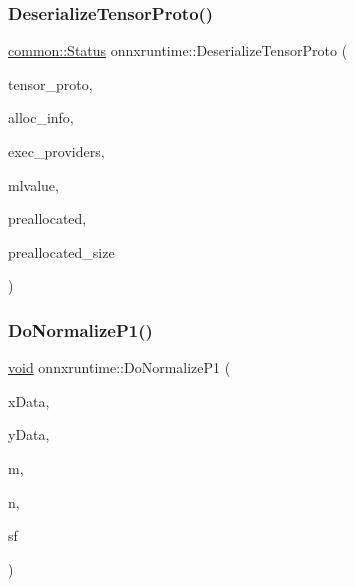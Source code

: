 \subsubsection{\texorpdfstring{Deserialize\+Tensor\+Proto()}{DeserializeTensorProto()}}
{\footnotesize\ttfamily \mbox{\hyperlink{classonnxruntime_1_1common_1_1Status}{common\+::\+Status}} onnxruntime\+::\+Deserialize\+Tensor\+Proto (\begin{DoxyParamCaption}\item[{const O\+N\+N\+X\+\_\+\+N\+A\+M\+E\+S\+P\+A\+C\+E\+::\+Tensor\+Proto \&}]{tensor\+\_\+proto,  }\item[{const \mbox{\hyperlink{structONNXRuntimeAllocatorInfo}{O\+N\+N\+X\+Runtime\+Allocator\+Info}} \&}]{alloc\+\_\+info,  }\item[{const \mbox{\hyperlink{classonnxruntime_1_1ExecutionProviders}{Execution\+Providers}} \&}]{exec\+\_\+providers,  }\item[{\mbox{\hyperlink{classonnxruntime_1_1MLValue}{M\+L\+Value}} \&}]{mlvalue,  }\item[{\mbox{\hyperlink{mlasi_8h_a88f941d423cb2a819b70a1358982b1a6}{void}} $\ast$}]{preallocated,  }\item[{\mbox{\hyperlink{mlasi_8h_a503efbc1c6e50825320ad909366b78ab}{size\+\_\+t}}}]{preallocated\+\_\+size }\end{DoxyParamCaption})}

\mbox{\label{namespaceonnxruntime_af67704c97c039836aea6f28df46fc23f}} 
\subsubsection{\texorpdfstring{Do\+Normalize\+P1()}{DoNormalizeP1()}}
{\footnotesize\ttfamily \mbox{\hyperlink{mlasi_8h_a88f941d423cb2a819b70a1358982b1a6}{void}} onnxruntime\+::\+Do\+Normalize\+P1 (\begin{DoxyParamCaption}\item[{const float $\ast$}]{x\+Data,  }\item[{float $\ast$}]{y\+Data,  }\item[{const int64\+\_\+t}]{m,  }\item[{const int64\+\_\+t}]{n,  }\item[{const int64\+\_\+t}]{sf }\end{DoxyParamCaption})}

